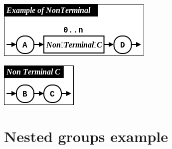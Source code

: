 \documentclass[letterpaper,10pt,english]{sphinxmanual}
\begin{document}
\includegraphics{Example_of_NonTerminal.png}

\includegraphics{Non_Terminal_C.png}


\section{Nested groups example}
\label{examples:nested-groups-example}
\end{document}
